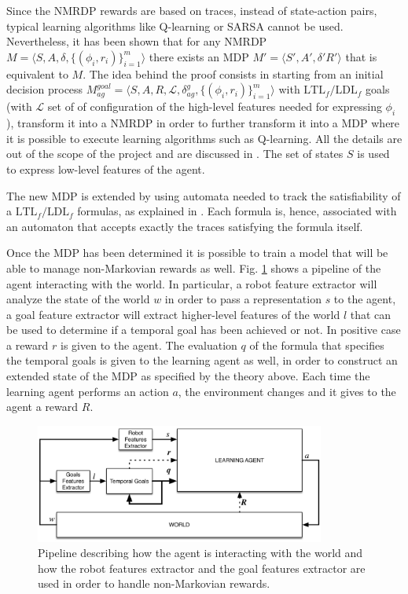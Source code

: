 Since the NMRDP rewards are based on traces, instead of state-action pairs,
typical learning algorithms like Q-learning or SARSA cannot be used.
Nevertheless, it has been shown \cite{DBLP:journals/corr/abs-1807-06333} that
for any NMRDP $M = \langle S, A, \delta, \{ (\phi_i, r_i) \}_{i=1}^m \rangle$
there exists an MDP $M' = \langle S', A', \delta' R' \rangle$ that is equivalent
to $M$. The idea behind the proof consists in starting from an initial
decision process $M_{ag}^{goal} = \langle S, A, R, \mathcal{L},
\delta_{ag}^g, \{ (\phi_i, r_i) \}_{i=1}^m \rangle$ with
$\text{LTL}_f/\text{LDL}_f$ goals (with $\mathcal{L}$ set of of configuration
of the high-level features needed for expressing $\phi_i$),
transform it into a NMRDP in order to
further transform it into a MDP where it is possible to execute learning
algorithms such as Q-learning. All the details are out of the scope of the
project and are discussed in \cite{DBLP:journals/corr/abs-1807-06333}. The
set of states $S$ is used to express low-level features of the agent.

The new MDP is extended by using automata needed to track the satisfiability
of a $\text{LTL}_f/\text{LDL}_f$ formulas, as explained in
\cite{DBLP:conf/aaai/2018}. Each formula is, hence, associated with an
automaton that accepts exactly the traces satisfying the formula itself.

Once the MDP has been determined it is possible to train a model that will
be able to manage non-Markovian rewards as well. Fig.
\ref{fig:rl-temporalgoals-pipeline} shows a pipeline of the
agent interacting with the world. In particular, a robot feature extractor
will analyze the state of the world $w$ in order to pass a representation $s$ to the
agent, a goal feature extractor will extract higher-level features of the world
$l$
that can be used to determine if a temporal goal has been achieved or not. In
positive case a reward $r$ is given to the agent. The evaluation $q$ of the formula
that specifies the temporal goals is given to the learning agent as well, in
order to construct an extended state of the MDP as specified by the theory above.
Each time the learning agent performs an action $a$, the environment changes
and it gives to the agent a reward $R$.
\begin{figure}
    \centering
    \includegraphics[width=0.85\textwidth]{images/rl-temporalgoals-pipeline.png}
    \caption{Pipeline describing how the agent is interacting with the
        world and how the robot features extractor and the goal features
        extractor are used in order to handle non-Markovian rewards.}
    \label{fig:rl-temporalgoals-pipeline}
\end{figure}

